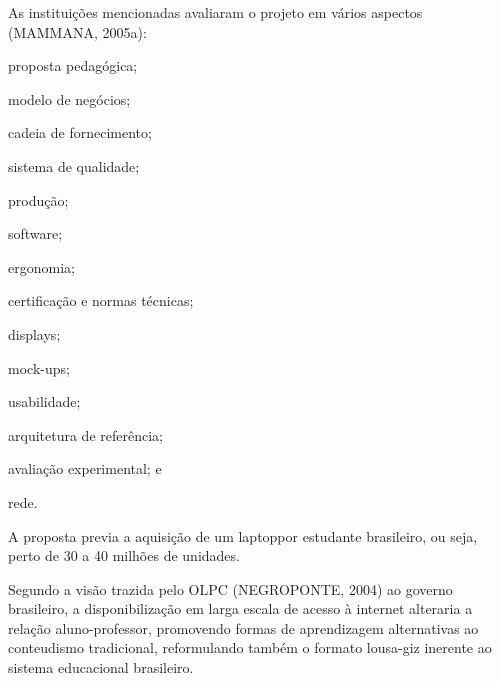 \documentclass[
12pt,		%
openright,	%
twoside,  %
a4paper,			%
chapter=TITLE,		%
english,			%
french,				%
spanish,			%
brazil				%
]{USPSC-classe/USPSC}
\begin{document}
\noindent\begin{center}\mbox{\centering{}}\end{center}


As institui\c{c}\~oes mencionadas avaliaram o projeto em v\'arios aspectos  (MAMMANA, 2005a):


















\begin{alineas}
\item proposta pedag\'ogica;
\item modelo de neg\'ocios;
\item cadeia de fornecimento;
\item sistema de qualidade;
\item produ\c{c}\~ao;
\item software;
\item ergonomia;
\item certifica\c{c}\~ao e normas t\'ecnicas;
\item displays;
\item mock-ups;
\item usabilidade;
\item arquitetura de refer\^encia;
\item avalia\c{c}\~ao experimental; e
\item rede.
\end{alineas}

A proposta previa a aquisi\c{c}\~ao de um \textquotedbl laptop\textquotedbl  por estudante brasileiro, ou seja, perto de 30 a 40 milh\~oes de unidades.

















Segundo a vis\~ao trazida pelo OLPC  (NEGROPONTE, 2004) ao governo brasileiro, a disponibiliza\c{c}\~ao em larga escala de acesso \`a internet alteraria a rela\c{c}\~ao aluno-professor, promovendo formas de aprendizagem alternativas ao conteudismo tradicional, reformulando tamb\'em o formato lousa-giz inerente ao sistema educacional brasileiro.
\end{document}
